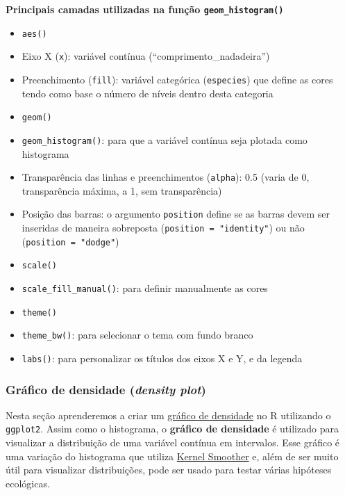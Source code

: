 \documentclass[
]{article}
\providecommand{\tightlist}{%
  \setlength{\itemsep}{0pt}\setlength{\parskip}{0pt}}
\begin{document}
\textbf{Principais camadas utilizadas na função \texttt{geom\_histogram()}}

\begin{itemize}
\tightlist
\item
  \texttt{aes()}
\item
  Eixo X (\texttt{x}): variável contínua (``comprimento\_nadadeira'')
\item
  Preenchimento (\texttt{fill}): variável categórica (\texttt{especies}) que define as cores tendo como base o número de níveis dentro desta categoria
\item
  \texttt{geom()}
\item
  \texttt{geom\_histogram()}: para que a variável contínua seja plotada como histograma
\item
  Transparência das linhas e preenchimentos (\texttt{alpha}): 0.5 (varia de 0, transparência máxima, a 1, sem transparência)
\item
  Posição das barras: o argumento \texttt{position} define se as barras devem ser inseridas de maneira sobreposta (\texttt{position\ =\ "identity"}) ou não (\texttt{position\ =\ "dodge"})
\item
  \texttt{scale()}
\item
  \texttt{scale\_fill\_manual()}: para definir manualmente as cores
\item
  \texttt{theme()}
\item
  \texttt{theme\_bw()}: para selecionar o tema com fundo branco
\item
  \texttt{labs()}: para personalizar os títulos dos eixos X e Y, e da legenda
\end{itemize}

\hypertarget{gruxe1fico-de-densidade-density-plot}{%
\subsubsection{\texorpdfstring{Gráfico de densidade (\emph{density plot})}{Gráfico de densidade (density plot)}}\label{gruxe1fico-de-densidade-density-plot}}

Nesta seção aprenderemos a criar um \href{https://www.data-to-viz.com/graph/density.html}{gráfico de densidade} no R utilizando o \texttt{ggplot2}. Assim como o histograma, o \textbf{gráfico de densidade} é utilizado para visualizar a distribuição de uma variável contínua em intervalos. Esse gráfico é uma variação do histograma que utiliza \href{https://en.wikipedia.org/wiki/Kernel_smoother}{Kernel Smoother} e, além de ser muito útil para visualizar distribuições, pode ser usado para testar várias hipóteses ecológicas.
\end{document}
